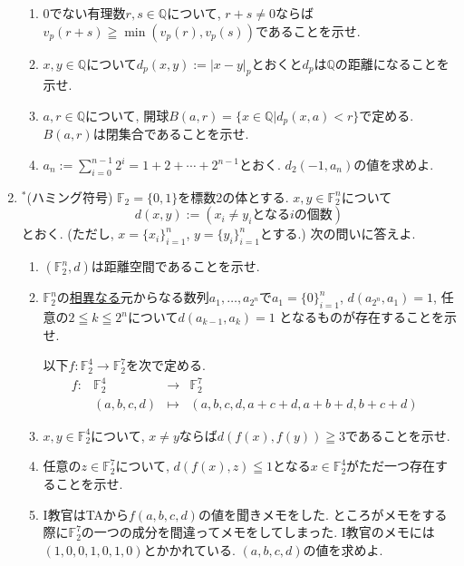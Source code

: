 \documentclass[dvipdfmx,a4paper,11pt]{article}
\newcommand{\Q}{\mathbb{Q}}
\theoremstyle{definition}
\begin{document}
\begin{enumerate}[label=\textbf{問}\ref*{sec-euc}.\arabic*]
\begin{enumerate}
\setlength{\parskip}{0cm}
  \setlength{\itemsep}{0pt} 
\item 0でない有理数$r,s \in \Q$について, $r+s \neq 0$ならば$v_{p}(r+s) \geqq \min(v_{p}(r), v_{p}(s))$であることを示せ.
\item $x,y \in \Q$について$d_{p}(x,y) :=|x-y|_{p} $とおくと$d_{p}$は$\Q$の距離になることを示せ.
\item $a,r \in \Q$について, 開球$B(a,r)=\{x \in \Q | d_{p}(x,a) < r \}$で定める. $B(a,r)$は閉集合であることを示せ.
\item $a_n := \sum_{i=0}^{n-1}2^i =1 + 2 + \cdots + 2^{n-1}$とおく. $d_{2}(-1, a_{n})$の値を求めよ. 
\end{enumerate}

\item $^{*}$(ハミング符号)
$\mathbb{F}_{2}=\{0,1\}$を標数2の体とする. 
$x,y \in \mathbb{F}_{2}^{n}$について
$$
d(x,y):= (\text{$x_i \neq y_i$となる$i$の個数})
$$
とおく. (ただし, $x=\{ x_i\}_{i=1}^{n}$, $y=\{ y_i\}_{i=1}^{n}$とする.) 次の問いに答えよ.
\begin{enumerate}
\setlength{\parskip}{0cm}
  \setlength{\itemsep}{0pt} 
\item $(\mathbb{F}_{2}^{n}, d)$は距離空間であることを示せ.
\item $\mathbb{F}_{2}^{n}$の\underline{相異なる}元からなる数列$a_{1}, \ldots, a_{2^n }$で$a_1=\{ 0\}_{i=1}^{n}$, $d(a_{2^n }, a_{1})=1$, 任意の$2 \leqq k \leqq 2^{n}$について$d(a_{k-1},a_{k})=1$
 となるものが存在することを示せ.
 
 \hspace{-22pt}以下$f : \mathbb{F}_{2}^{4} \to \mathbb{F}_{2}^{7}$を次で定める.
$$
\begin{array}{ccccc}
f: &\mathbb{F}_{2}^{4}& \rightarrow & \mathbb{F}_{2}^{7}& \\
&(a,b,c,d) & \longmapsto & 
(a,b,c,d,a+c+d, a+b+d, b+c+d)&
\end{array}
$$


\item $x, y \in \mathbb{F}_{2}^{4}$について, $x\neq y$ならば$d(f(x), f(y)) \geqq 3$であることを示せ.
\item 任意の$z \in \mathbb{F}_{2}^{7}$について, $d(f(x), z) \leqq 1$となる$x \in \mathbb{F}_{2}^{4} $がただ一つ存在することを示せ.
\item I教官はTAから$f(a,b,c,d)$の値を聞きメモをした. ところがメモをする際に$\mathbb{F}_{2}^{7}$の一つの成分を間違ってメモをしてしまった.  I教官のメモには$(1,0,0,1,0,1,0)$とかかれている. $(a,b,c,d)$の値を求めよ. 
  \end{enumerate}
  \end{enumerate}
\end{document}

